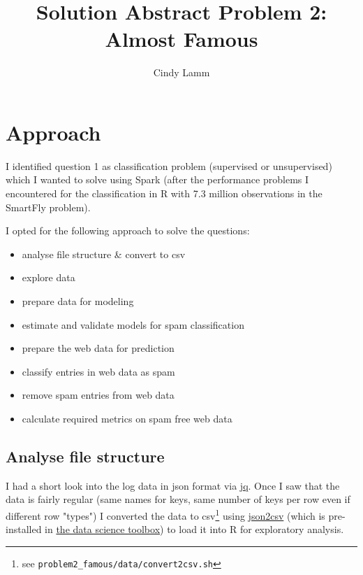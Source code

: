 \documentclass{article}\usepackage[]{graphicx}\usepackage[]{color}
\begin{document}
\VerbatimFootnotes

\author{Cindy Lamm}
\title{Solution Abstract Problem 2: Almost Famous}

\maketitle


\section{Approach} %
\label{approach}

I identified question 1 as classification problem (supervised or unsupervised) which I wanted to solve using Spark (after the performance problems I encountered for the classification in R with 7.3 million observations in the SmartFly problem). 

I opted for the following approach to solve the questions:
\begin{itemize}
	\item analyse file structure \& convert to csv
	\item explore data
	\item prepare data for modeling
	\item estimate and validate models for spam classification
	\item prepare the web data for prediction
	\item classify entries in web data as spam
	\item remove spam entries from web data
	\item calculate required metrics on spam free web data
\end{itemize}



\subsection{Analyse file structure} %
\label{sub:analyse_file_structure}
I had a short look into the log data in json format via \href{http://stedolan.github.io/jq/}{jq}. Once I saw that the data is fairly regular (same names for keys, same number of keys per row even if different row "types") I converted the data to csv\footnote{see \verb+problem2_famous/data/convert2csv.sh+} using \href{https://github.com/zemirco/json2csv}{json2csv} (which is pre-installed in \href{http://datasciencetoolbox.org/}{the data science toolbox}) to load it into R for exploratory analysis.
\end{document}
